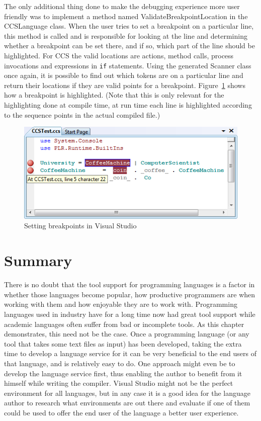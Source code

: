 	The only additional thing done to make the debugging experience more user 
	friendly was to implement a method named \textsf{ValidateBreakpointLocation} 
	in the \textsf{CCSLanguage} class. When the user tries to set a breakpoint 
	on a particular line, this method is called and is responsible for looking 
	at the line and determining whether a breakpoint can be set there, and if 
	so, which part of the line should be highlighted. For CCS the valid 
	locations are actions, method calls, process invocations and expressions in 
	\texttt{if} statements. Using the generated \textsf{Scanner} class once 
	again, it is possible to find out which tokens are on a particular line and 
	return their locations if they are valid points for a breakpoint. 
	Figure~\ref{fig:breakpoint} shows how a breakpoint is highlighted. (Note 
	that this is only relevant for the highlighting done at compile time, at run 
	time each line is highlighted according to the sequence points in the actual 
	compiled file.)

	\begin{figure}[h!]
		\centering
		\includegraphics[scale=0.5]{breakpoint.png}
		\caption{Setting breakpoints in Visual Studio}
		\label{fig:breakpoint}
	\end{figure}
	
	\section{Summary}
	
	There is no doubt that the tool support for programming languages is a 
	factor in whether those languages become popular, how productive programmers 
	are when working with them and how enjoyable they are to work with. 
	Programming languages used in industry have for a long time now had great 
	tool support while academic languages often suffer from bad or incomplete 
	tools. As this chapter demonstrates, this need not be the case. Once a 
	programming language (or any tool that takes some text files as input) has 
	been developed, taking the extra time to develop a language service for it 
	can be very beneficial to the end users of that language, and is relatively 
	easy to do. One approach might even be to develop the language service 
	first, thus enabling the author to benefit from it himself while writing the 
	compiler. Visual Studio might not be the perfect environment for all 
	languages, but in any case it is a good idea for the language author to 
	research what environments are out there and evaluate if one of them could 
	be used to offer the end user of the language a better user experience.